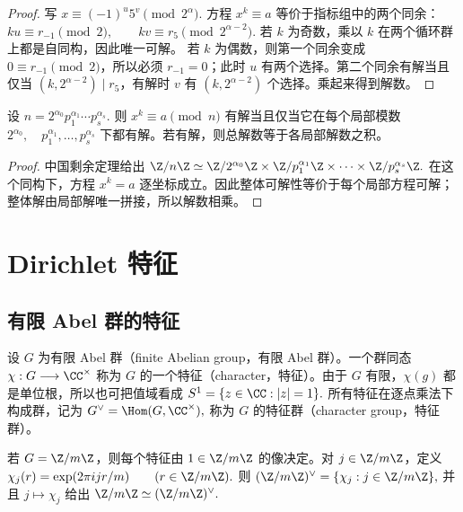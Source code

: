 \begin{proof}
写
\(
  x\equiv (-1)^u5^v\pmod {2^\alpha}.
\)
方程 $x^k\equiv a$ 等价于指标组中的两个同余：
\(
  ku\equiv r_{-1}\pmod 2,\qquad
  kv\equiv r_5\pmod {2^{\alpha-2}}.
\)
若 $k$ 为奇数，乘以 $k$ 在两个循环群上都是自同构，因此唯一可解。
若 $k$ 为偶数，则第一个同余变成 $0\equiv r_{-1}\pmod2$，所以必须 $r_{-1}=0$；此时 $u$ 有两个选择。第二个同余有解当且仅当
$(k,2^{\alpha-2})\mid r_5$，有解时 $v$ 有 $(k,2^{\alpha-2})$ 个选择。乘起来得到解数。
\end{proof}

\begin{theorem}[一般模数的二项同余]
设
\(
  n=2^{\alpha_0}p_1^{\alpha_1}\cdots p_s^{\alpha_s}.
\)
则
\(
  x^k\equiv a\pmod n
\)
有解当且仅当它在每个局部模数
\(
  2^{\alpha_0},\quad p_1^{\alpha_1},\ldots,p_s^{\alpha_s}
\)
下都有解。若有解，则总解数等于各局部解数之积。
\end{theorem}

\begin{proof}
中国剩余定理给出
\(
  \Z/n\Z\simeq
  \Z/2^{\alpha_0}\Z\times
  \Z/p_1^{\alpha_1}\Z\times\cdots\times
  \Z/p_s^{\alpha_s}\Z.
\)
在这个同构下，方程 $x^k=a$ 逐坐标成立。因此整体可解性等价于每个局部方程可解；整体解由局部解唯一拼接，所以解数相乘。
\end{proof}

\chapter{Dirichlet 特征}

\section{有限 Abel 群的特征}

\begin{definition}
设 $G$ 为有限 Abel 群（finite Abelian group，有限 Abel 群）。一个群同态
\(
  \chi:G\longrightarrow \C^\times
\)
称为 $G$ 的一个特征（character，特征）。由于 $G$ 有限，$\chi(g)$ 都是单位根，所以也可把值域看成
\(
  S^1=\{z\in\C:|z|=1\}.
\)
所有特征在逐点乘法下构成群，记为
\(
  G^\vee=\Hom(G,\C^\times),
\)
称为 $G$ 的特征群（character group，特征群）。
\end{definition}

\begin{example}
若 $G=\Cyc m$，则每个特征由 $1\in\Cyc m$ 的像决定。对
$j\in\Z/m\Z$，定义
\(
  \chi_j(r)=\expi{jr/m}\qquad(r\in\Z/m\Z).
\)
则
\(
  (\Cyc m)^\vee=\{\chi_j:j\in\Z/m\Z\},
\)
并且 $j\mapsto \chi_j$ 给出
\(
  \Cyc m\simeq (\Cyc m)^\vee.
\)
\end{example}

